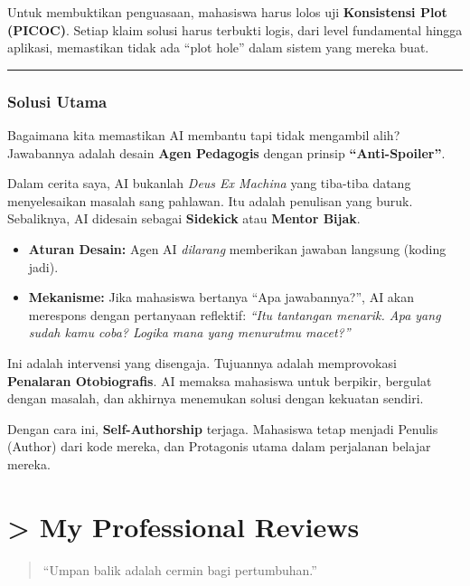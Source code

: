 \documentclass[
  letterpaper,
  DIV=11,
  numbers=noendperiod]{scrreprt}
\providecommand{\tightlist}{%
  \setlength{\itemsep}{0pt}\setlength{\parskip}{0pt}}
\begin{document}
Untuk membuktikan penguasaan, mahasiswa harus lolos uji
\textbf{Konsistensi Plot (PICOC)}. Setiap klaim solusi harus terbukti
logis, dari level fundamental hingga aplikasi, memastikan tidak ada
``plot hole'' dalam sistem yang mereka buat.

\begin{center}\rule{0.5\linewidth}{0.5pt}\end{center}

\subsection{Solusi Utama}\label{solusi-utama}

Bagaimana kita memastikan AI membantu tapi tidak mengambil alih?
Jawabannya adalah desain \textbf{Agen Pedagogis} dengan prinsip
\textbf{``Anti-Spoiler''}.

Dalam cerita saya, AI bukanlah \emph{Deus Ex Machina} yang tiba-tiba
datang menyelesaikan masalah sang pahlawan. Itu adalah penulisan yang
buruk. Sebaliknya, AI didesain sebagai \textbf{Sidekick} atau
\textbf{Mentor Bijak}.

\begin{itemize}
\tightlist
\item
  \textbf{Aturan Desain:} Agen AI \emph{dilarang} memberikan jawaban
  langsung (koding jadi).
\item
  \textbf{Mekanisme:} Jika mahasiswa bertanya ``Apa jawabannya?'', AI
  akan merespons dengan pertanyaan reflektif: \emph{``Itu tantangan
  menarik. Apa yang sudah kamu coba? Logika mana yang menurutmu
  macet?''}
\end{itemize}

Ini adalah intervensi yang disengaja. Tujuannya adalah memprovokasi
\textbf{Penalaran Otobiografis}. AI memaksa mahasiswa untuk berpikir,
bergulat dengan masalah, dan akhirnya menemukan solusi dengan kekuatan
sendiri.

Dengan cara ini, \textbf{Self-Authorship} terjaga. Mahasiswa tetap
menjadi Penulis (Author) dari kode mereka, dan Protagonis utama dalam
perjalanan belajar mereka.


\chapter{\textgreater{} My Professional
Reviews}\label{my-professional-reviews}

\begin{quote}
``Umpan balik adalah cermin bagi pertumbuhan.''
\end{quote}
\end{document}
